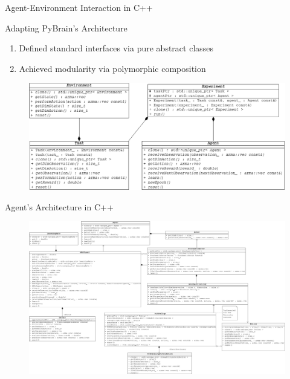 \begin{frame}[c]{Agent-Environment Interaction in C++}
	\begin{block}{Adapting PyBrain's Architecture}
		\begin{enumerate}
			\item Defined standard interfaces via pure abstract classes
			\item Achieved modularity via polymorphic composition
		\end{enumerate}
	\end{block}
	
	\begin{figure}[h]
		\centering
		\includegraphics[width=0.8\framewidth]{Images/AgentEnvironmentInteractionReduced}
	\end{figure}
\end{frame}

\begin{frame}[c]{Agent's Architecture in C++}
	\begin{figure}[h]
		\centering
		\includegraphics[width=0.8\framewidth]{Images/agent_reduced}
	\end{figure}
\end{frame}

